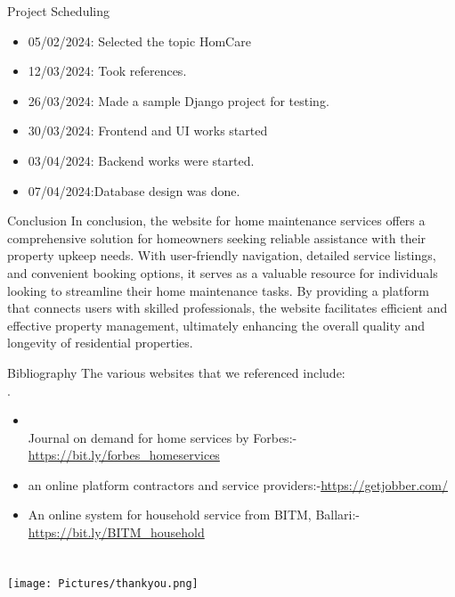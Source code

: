 \documentclass{beamer} %
\begin{document}

  
\begin{frame}[c]{Project Scheduling}
    \begin{itemize}
        \item 05/02/2024: Selected the topic HomCare
        \item 12/03/2024: Took references.
        \item 26/03/2024: Made a sample Django project for testing.
        \item 30/03/2024: Frontend and UI works started
        \item 03/04/2024: Backend  works were started.
        \item 07/04/2024:Database design was done.
    \end{itemize}
\end{frame}

\begin{frame}{Conclusion}
In conclusion, the website for home maintenance services offers a comprehensive solution for homeowners seeking reliable assistance with their property upkeep needs. With user-friendly navigation, detailed service listings, and convenient booking options, it serves as a valuable resource for individuals looking to streamline their home maintenance tasks. By providing a platform that connects users with skilled professionals, the website facilitates efficient and effective property management, ultimately enhancing the overall quality and longevity of residential properties.
    
\end{frame}
\begin{frame}{Bibliography}
    The various websites that we referenced include:\\.
    \begin{minipage}{1\textwidth}
            \begin{itemize}
                \item \\Journal on demand for home services by Forbes:-\color{blue}\url{https://bit.ly/forbes_homeservices}
                \color{black}\item an online platform contractors and service providers:-\color{blue}\url{https://getjobber.com/}
                \color{black}\item An online system for household service from BITM, Ballari:-\color{blue}\url{https://bit.ly/BITM_household}
            \end{itemize}
        \end{minipage}
\end{frame}

\section{}

\begin{frame}
\texttt{[image: Pictures/thankyou.png]}

\end{frame}
\end{document}
